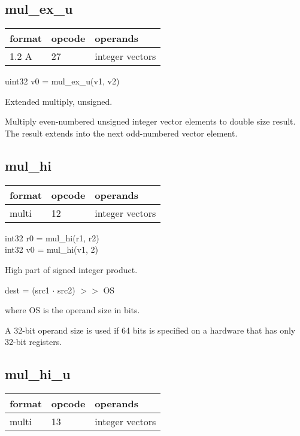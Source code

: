 \documentclass[forwardcom.tex]{subfiles}
\begin{document}
\subsection{mul\_ex\_u}
\label{table:mulExUInstruction}
\begin{tabular}{|p{12mm}|p{15mm}|p{100mm}|}
\hline
\bfseries format & \bfseries opcode & \bfseries operands \\ \hline
1.2 A & 27 & integer vectors \\ \hline
\end{tabular}
\vv

uint32 v0 = mul\_ex\_u(v1, v2)
\vv

Extended multiply, unsigned.
\vv

Multiply even-numbered unsigned integer vector elements to double size result. The result extends into the next odd-numbered vector element.
\vv


\subsection{mul\_hi}
\label{table:mulHiInstruction}
\begin{tabular}{|p{12mm}|p{15mm}|p{100mm}|}
\hline
\bfseries format & \bfseries opcode & \bfseries operands \\ \hline
multi & 12 & integer vectors \\ \hline
\end{tabular}
\vv

int32 r0 = mul\_hi(r1, r2) \\
int32 v0 = mul\_hi(v1, 2)
\vv

High part of signed integer product.
\vv

dest = (src1 $\cdot$ src2) $>>$ OS

where OS is the operand size in bits.
\vv

A 32-bit operand size is used if 64 bits is specified on a hardware that has only 32-bit registers.
\vv


\subsection{mul\_hi\_u}
\label{table:mulHiUInstruction}
\begin{tabular}{|p{12mm}|p{15mm}|p{100mm}|}
\hline
\bfseries format & \bfseries opcode & \bfseries operands \\ \hline
multi & 13 & integer vectors \\ \hline
\end{tabular}
\vv
\end{document}
